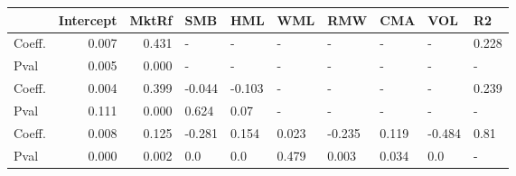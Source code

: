 \begin{tabular}{lrrlllllll}
\toprule
{} &  Intercept &  MktRf &    SMB &    HML &    WML &    RMW &    CMA &    VOL &     R2 \\
\midrule
Coeff.  &      0.007 &  0.431 &      - &      - &      - &      - &      - &      - &  0.228 \\
Pval    &      0.005 &  0.000 &      - &      - &      - &      - &      - &      - &      - \\
Coeff.  &      0.004 &  0.399 & -0.044 & -0.103 &      - &      - &      - &      - &  0.239 \\
Pval    &      0.111 &  0.000 &  0.624 &   0.07 &      - &      - &      - &      - &      - \\
Coeff.  &      0.008 &  0.125 & -0.281 &  0.154 &  0.023 & -0.235 &  0.119 & -0.484 &   0.81 \\
Pval    &      0.000 &  0.002 &    0.0 &    0.0 &  0.479 &  0.003 &  0.034 &    0.0 &      - \\
\bottomrule
\end{tabular}
